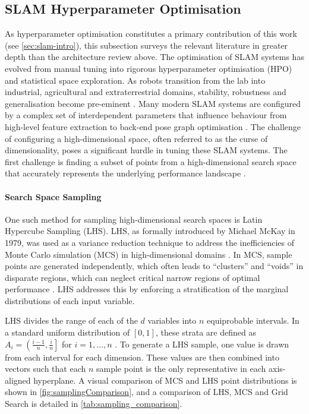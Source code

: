 \subsection{SLAM Hyperparameter Optimisation}
\label{subsec:slam-hyperparameter}
As hyperparameter optimisation constitutes a primary contribution of this work (see \cref{sec:slam-intro}), this subsection surveys the relevant literature in greater depth than the architecture review above.
The optimisation of SLAM systems has evolved from manual tuning into rigorous hyperparameter optimisation (HPO) and statistical space exploration. As robots transition from the lab into industrial, agricultural and extraterrestrial domains, stability, robustness and generalisation become pre-eminent \cite{weiLiDARVisualInertial2026}. Many modern SLAM systems are configured by a complex set of interdependent parameters that influence behaviour from high-level feature extraction to back-end pose graph optimisation \cite{hanMultiObjectiveOptimizationLoop2020}. The challenge of configuring a high-dimensional space, often referred to as the curse of dimensionality, poses a significant hurdle in tuning these SLAM systems. The first challenge is finding a subset of points from a high-dimensional search space that accurately represents the underlying performance landscape \cite{hanMultiObjectiveOptimizationLoop2020}. 

\paragraph{Search Space Sampling}
One such method for sampling high-dimensional search spaces is Latin Hypercube Sampling (LHS). LHS, as formally introduced by Michael McKay in 1979, was used as a variance reduction technique to address the inefficiencies of Monte Carlo simulation (MCS) in high-dimensional domains \cite{chrismanLatinHypercubeSampling2014}. In MCS, sample points are generated independently, which often leads to ``clusters'' and ``voids'' in disparate regions, which can neglect critical narrow regions of optimal performance \cite{deutschLatinHypercubeSampling2012}. LHS addresses this by enforcing a stratification of the marginal distributions of each input variable.

LHS divides the range of each of the $d$ variables into $n$ equiprobable intervals. In a standard uniform distribution of $[0, 1]$, these strata are defined as $A_i = \left( \frac{i-1}{n}, \frac{i}{n} \right]$ for $i = 1, \dots, n$ \cite{chrismanLatinHypercubeSampling2014}. To generate a LHS sample, one value is drawn from each interval for each dimension. These values are then combined into vectors such that
each $n$ sample point is the only representative in each axis-aligned hyperplane. A visual comparison of MCS and LHS point distributions is shown in \cref{fig:samplingComparison}, and a comparison of LHS, MCS and Grid Search is detailed in \cref{tab:sampling_comparison}.

